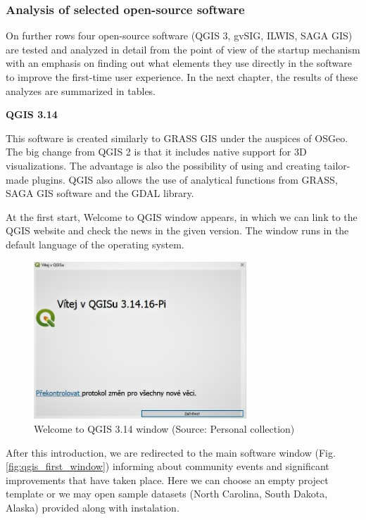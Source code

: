 \documentclass[a4paper,10pt,twoside]{article}
\begin{document}
\newpage
\vspace*{-1cm}
\subsubsection{Analysis of selected open-source software}

\noindent On further rows four open-source software (QGIS 3, gvSIG, ILWIS, SAGA GIS) are tested and analyzed in detail from the point of view of the startup mechanism with an emphasis on finding out what elements they use directly in the software to improve the first-time user experience. In the next chapter, the results of these analyzes are summarized in tables.

\bigskip

\noindent \textbf {QGIS 3.14}

\noindent This software is created similarly to GRASS GIS under the auspices of OSGeo. The big change from QGIS 2 is that it includes native support for 3D visualizations. The advantage is also the possibility of using and creating tailor-made plugins. QGIS also allows the use of analytical functions from GRASS, SAGA GIS software and the GDAL library. 

At the first start, Welcome to QGIS window appears, in which we can link to the QGIS website and check the news in the given version. The window runs in the default language of the operating system.

\vspace{0.3cm}
\begin{figure}[hbt!] 
\begin{center}
\includegraphics[width=8cm]{../pictures/qgis_startup_window.JPG} 
\caption[Welcome to QGIS 3.14 window]{Welcome to QGIS 3.14 window (Source: Personal collection)}
\label{fig:qgis_startup_window}
\end{center}
\end{figure}

\noindent After this introduction, we are redirected to the main software window (Fig. \ref{fig:qgis_first_window})  informing about community events and significant improvements that have taken place. Here we can choose an empty project template or we may open sample datasets (North Carolina, South Dakota, Alaska) provided along with instalation.
\end{document}
